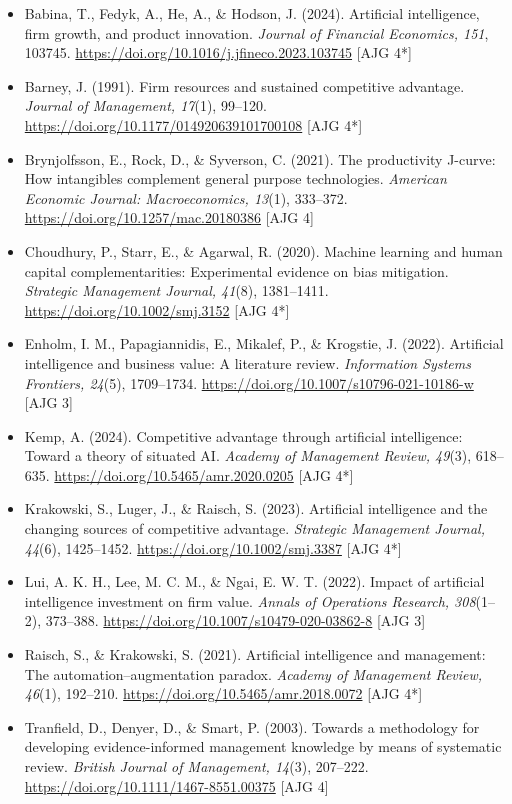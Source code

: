 \documentclass[12pt, a4paper]{article}
\begin{document}
\begingroup\small
\setlength{\parskip}{0pt}
\begin{itemize}\setlength{\itemsep}{2pt}
  \item Babina, T., Fedyk, A., He, A., \& Hodson, J. (2024). Artificial
  intelligence, firm growth, and product innovation. \emph{Journal of Financial
  Economics, 151}, 103745. \url{https://doi.org/10.1016/j.jfineco.2023.103745}
  \hfill [AJG 4*]
  \item Barney, J. (1991). Firm resources and sustained competitive advantage.
  \emph{Journal of Management, 17}(1), 99--120.
  \url{https://doi.org/10.1177/014920639101700108} \hfill [AJG 4*]
  \item Brynjolfsson, E., Rock, D., \& Syverson, C. (2021). The productivity
  J-curve: How intangibles complement general purpose technologies.
  \emph{American Economic Journal: Macroeconomics, 13}(1), 333--372.
  \url{https://doi.org/10.1257/mac.20180386} \hfill [AJG 4]
  \item Choudhury, P., Starr, E., \& Agarwal, R. (2020). Machine learning and
  human capital complementarities: Experimental evidence on bias mitigation.
  \emph{Strategic Management Journal, 41}(8), 1381--1411.
  \url{https://doi.org/10.1002/smj.3152} \hfill [AJG 4*]
  \item Enholm, I. M., Papagiannidis, E., Mikalef, P., \& Krogstie, J. (2022).
  Artificial intelligence and business value: A literature review.
  \emph{Information Systems Frontiers, 24}(5), 1709--1734.
  \url{https://doi.org/10.1007/s10796-021-10186-w} \hfill [AJG 3]
  \item Kemp, A. (2024). Competitive advantage through artificial intelligence:
  Toward a theory of situated AI. \emph{Academy of Management Review, 49}(3),
  618--635. \url{https://doi.org/10.5465/amr.2020.0205} \hfill [AJG 4*]
  \item Krakowski, S., Luger, J., \& Raisch, S. (2023). Artificial
  intelligence and the changing sources of competitive advantage.
  \emph{Strategic Management Journal, 44}(6), 1425--1452.
  \url{https://doi.org/10.1002/smj.3387} \hfill [AJG 4*]
  \item Lui, A. K. H., Lee, M. C. M., \& Ngai, E. W. T. (2022). Impact of
  artificial intelligence investment on firm value. \emph{Annals of Operations
  Research, 308}(1--2), 373--388. \url{https://doi.org/10.1007/s10479-020-03862-8}
  \hfill [AJG 3]
  \item Raisch, S., \& Krakowski, S. (2021). Artificial intelligence and
  management: The automation--augmentation paradox. \emph{Academy of Management
  Review, 46}(1), 192--210. \url{https://doi.org/10.5465/amr.2018.0072} \hfill [AJG 4*]
  \item Tranfield, D., Denyer, D., \& Smart, P. (2003). Towards a methodology
  for developing evidence-informed management knowledge by means of systematic
  review. \emph{British Journal of Management, 14}(3), 207--222.
  \url{https://doi.org/10.1111/1467-8551.00375} \hfill [AJG 4]
\end{itemize}
\endgroup
\end{document}
